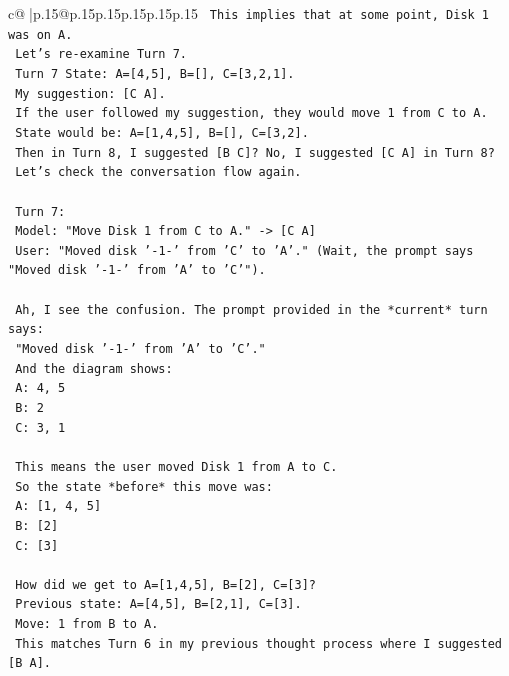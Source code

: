 \documentclass{article}
\begin{document}
{\begin{supertabular}{c@{$\;$}|p{.15\linewidth}@{}p{.15\linewidth}p{.15\linewidth}p{.15\linewidth}p{.15\linewidth}p{.15\linewidth}}
{{{\texttt{   This implies that at some point, Disk 1 was on A.} \\
\texttt{   Let's re{-}examine Turn 7.} \\
\texttt{   Turn 7 State: A={[}4,5{]}, B={[}{]}, C={[}3,2,1{]}.} \\
\texttt{   My suggestion: {[}C A{]}.} \\
\texttt{   If the user followed my suggestion, they would move 1 from C to A.} \\
\texttt{   State would be: A={[}1,4,5{]}, B={[}{]}, C={[}3,2{]}.} \\
\texttt{   Then in Turn 8, I suggested {[}B C{]}? No, I suggested {[}C A{]} in Turn 8?} \\
\texttt{   Let's check the conversation flow again.} \\
\\ 
\texttt{   Turn 7:} \\
\texttt{   Model: "Move Disk 1 from C to A." {-}> {[}C A{]}} \\
\texttt{   User: "Moved disk '{-}1{-}' from 'C' to 'A'." (Wait, the prompt says "Moved disk '{-}1{-}' from 'A' to 'C'").} \\
\\ 
\texttt{   Ah, I see the confusion. The prompt provided in the *current* turn says:} \\
\texttt{   "Moved disk '{-}1{-}' from 'A' to 'C'."} \\
\texttt{   And the diagram shows:} \\
\texttt{   A: 4, 5} \\
\texttt{   B: 2} \\
\texttt{   C: 3, 1} \\
\\ 
\texttt{   This means the user moved Disk 1 from A to C.} \\
\texttt{   So the state *before* this move was:} \\
\texttt{   A: {[}1, 4, 5{]}} \\
\texttt{   B: {[}2{]}} \\
\texttt{   C: {[}3{]}} \\
\\ 
\texttt{   How did we get to A={[}1,4,5{]}, B={[}2{]}, C={[}3{]}?} \\
\texttt{   Previous state: A={[}4,5{]}, B={[}2,1{]}, C={[}3{]}.} \\
\texttt{   Move: 1 from B to A.} \\
\texttt{   This matches Turn 6 in my previous thought process where I suggested {[}B A{]}.} \\
}}}
\end{supertabular}}
\end{document}
